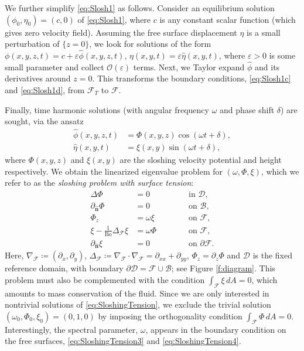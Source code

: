 \documentclass[letterpaper, 12pt]{amsart}
\newcommand{\bond}{\mathrm{Bo}}
\newcommand{\D}{\mathcal{D}}
\newcommand{\B}{\mathcal{B}}
\newcommand{\F}{\mathcal{F}}
\renewcommand{\O}{\mathcal{O}}
\newcommand{\n}{\mathbf{\hat{n}}}
\begin{document}
We further simplify \eqref{eq:Slosh1} as follows. Consider an equilibrium solution $(\phi_0,\eta_0)=(c,0)$ of \eqref{eq:Slosh1}, where $c$ is any constant scalar function (which gives zero velocity field). Assuming the free surface displacement $\eta$ is a small perturbation of $\{z=0\}$,  we look for solutions of the form $\phi(x,y,z,t) = c + \varepsilon\hat\phi(x,y,z,t)$, $\eta(x,y,t) = \varepsilon\hat\eta(x,y,t)$,  where $\varepsilon>0$ is some small parameter and collect  $\O(\varepsilon)$ terms. 
Next, we Taylor expand $\hat\phi$ and its derivatives around $z=0$. This transforms the boundary conditions,  \eqref{eq:Slosh1c} and \eqref{eq:Slosh1d}, from $\F_T$ to $\F$.  

Finally, time harmonic solutions (with angular frequency $\omega$ and phase shift $\delta$) are sought, via the ansatz 
\begin{align*} 
\hat\phi(x,y,z,t) &= \Phi(x,y,z)\cos(\omega t + \delta), \\ 
\hat\eta(x,y,t) &=\xi(x,y)\sin(\omega t + \delta), 
\end{align*}
where $\Phi(x,y,z)$ and $\xi(x,y)$ are the sloshing velocity potential and height respectively.  We  obtain the linearized eigenvalue problem for $(\omega,\Phi,\xi)$, which we refer to as the \emph{sloshing problem with surface tension}:
\begin{subequations}\label{eq:SloshingTension}
\begin{alignat}{2}
\label{eq:SloshingTension1} \Delta\Phi &=0 && \qquad\textrm{ in }\D, \\ 
\label{eq:SloshingTension2} \partial_\n\Phi &= 0 && \qquad\textrm{ on }\B, \\ 
\label{eq:SloshingTension3} \Phi_z &= \omega\xi && \qquad\textrm{ on }\F, \\ 
\label{eq:SloshingTension4} \xi - \frac{1}{\bond}\Delta_\F\xi  &= \omega\Phi && \qquad\textrm{ on }\F, \\
\label{eq:SloshingTension5} \partial_\n\xi &=0 && \qquad\textrm{ on }\partial\F.  
\end{alignat}
\end{subequations}
Here, $\nabla_\F\coloneqq (\partial_x,\partial_y)$, $\Delta_\F\coloneqq\nabla_\F\cdot\nabla_\F=\partial_{xx} + \partial_{yy}$, $\Phi_z=\partial_z\Phi$ and $\D$ is the fixed reference domain, with boundary $\partial\D=\F\cup\B$; see Figure \ref{f:diagram}. This problem must also be complemented with the condition $\int_\F\xi\, dA=0$, which amounts to mass conservation of the fluid. Since we are only interested in nontrivial solutions of \eqref{eq:SloshingTension}, we exclude the trivial solution $(\omega_0,\Phi_0,\xi_0)=(0,1,0)$ by imposing the orthogonality condition $\int_\F\Phi\, dA = 0$. Interestingly, the spectral parameter, $\omega$, appears in the boundary condition on the free surfaces, \eqref{eq:SloshingTension3} and \eqref{eq:SloshingTension4}.
\end{document}
